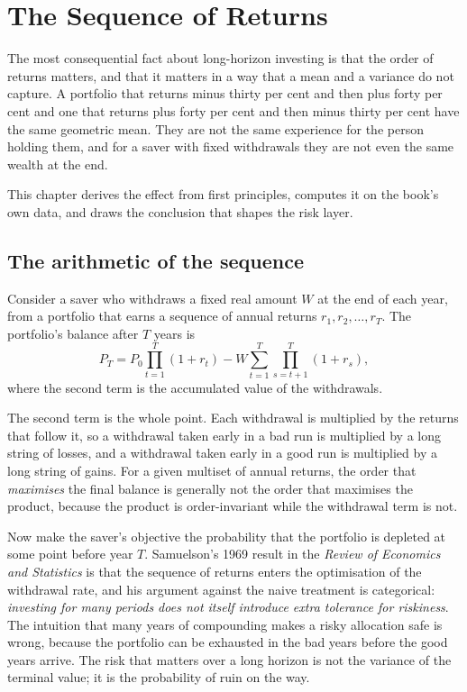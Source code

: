 
\chapter{The Sequence of Returns}
\label{ch:sequence}

The most consequential fact about long-horizon investing is that the order
of returns matters, and that it matters in a way that a mean and a variance
do not capture. A portfolio that returns minus thirty per cent and then plus
forty per cent and one that returns plus forty per cent and then minus
thirty per cent have the same geometric mean. They are not the same
experience for the person holding them, and for a saver with fixed
withdrawals they are not even the same wealth at the end.

This chapter derives the effect from first principles, computes it on the
book's own data, and draws the conclusion that shapes the risk layer.

\section{The arithmetic of the sequence}

Consider a saver who withdraws a fixed real amount \(W\) at the end of each
year, from a portfolio that earns a sequence of annual returns
\(r_1, r_2, \dots, r_T\). The portfolio's balance after \(T\) years is
\begin{equation}
P_T = P_0 \prod_{t=1}^{T}(1+r_t)
      - W\sum_{t=1}^{T}\prod_{s=t+1}^{T}(1+r_s),
\end{equation}
where the second term is the accumulated value of the withdrawals.

The second term is the whole point. Each withdrawal is multiplied by the
returns that follow it, so a withdrawal taken early in a bad run is
multiplied by a long string of losses, and a withdrawal taken early in a
good run is multiplied by a long string of gains. For a given multiset of
annual returns, the order that \emph{maximises} the final balance is
generally not the order that maximises the product, because the product is
order-invariant while the withdrawal term is not.

Now make the saver's objective the probability that the portfolio is
depleted at some point before year \(T\). Samuelson's 1969 result in the
\emph{Review of Economics and Statistics} is that the sequence of returns
enters the optimisation of the withdrawal rate, and his argument against
the naive treatment is categorical: \emph{investing for many periods does
not itself introduce extra tolerance for riskiness}. The intuition that
many years of compounding makes a risky allocation safe is wrong, because
the portfolio can be exhausted in the bad years before the good years
arrive. The risk that matters over a long horizon is not the variance of
the terminal value; it is the probability of ruin on the way.

